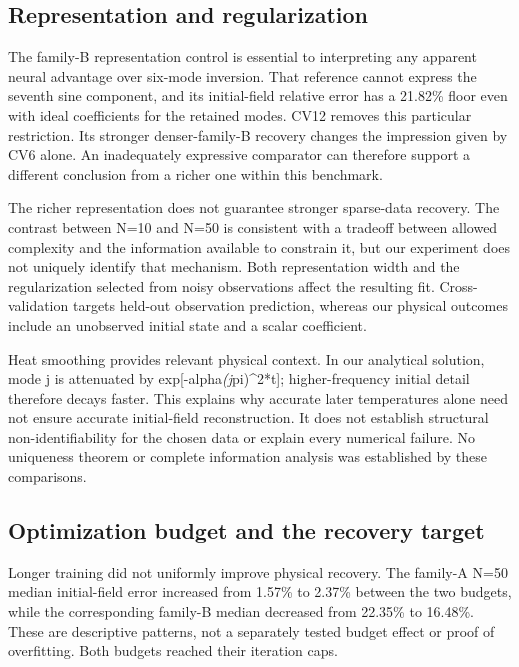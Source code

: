 \documentclass[10pt,a4paper]{article}
\begin{document}
\subsection{Representation and regularization}

The family-B representation control is essential to interpreting any apparent
neural advantage over six-mode inversion. That reference cannot express the
seventh sine component, and its initial-field relative error has a 21.82\% floor
even with ideal coefficients for the retained modes. CV12 removes this particular
restriction. Its stronger denser-family-B recovery changes the impression given
by CV6 alone. An inadequately expressive comparator can therefore support a
different conclusion from a richer one within this benchmark.

The richer representation does not guarantee stronger sparse-data recovery.
The contrast between N=10 and N=50 is consistent with a tradeoff between allowed
complexity and the information available to constrain it, but our experiment
does not uniquely identify that mechanism. Both representation width and the
regularization selected from noisy observations affect the resulting fit.
Cross-validation targets held-out observation prediction, whereas our physical
outcomes include an unobserved initial state and a scalar coefficient.

Heat smoothing provides relevant physical context. In our analytical solution,
mode j is attenuated by exp[-alpha\emph{(j}pi)\textasciicircum{}2*t]; higher-frequency initial detail
therefore decays faster. This explains why accurate later temperatures alone
need not ensure accurate initial-field reconstruction. It does not establish
structural non-identifiability for the chosen data or explain every numerical
failure. No uniqueness theorem or complete information analysis was established
by these comparisons.

\subsection{Optimization budget and the recovery target}

Longer training did not uniformly improve physical recovery. The family-A
N=50 median initial-field error increased from 1.57\% to 2.37\% between the two
budgets, while the corresponding family-B median decreased from 22.35\% to
16.48\%. These are descriptive patterns, not a separately tested budget effect
or proof of overfitting. Both budgets reached their iteration caps.
\end{document}
